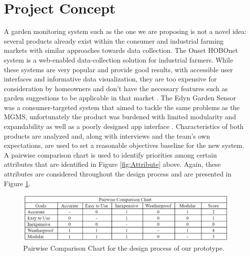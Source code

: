 \documentclass{report}
\begin{document}
\section{Project Concept}
A garden monitoring system such as the one we are proposing is not a novel idea: several products already exist within the consumer and industrial farming markets with similar approaches towards data collection. The Onset HOBOnet system is a web-enabled data-collection solution for industrial farmers. While these systems are very popular and provide good results, with accessible user interfaces and informative data visualization, they are too expensive for consideration by homeowners and don’t have the necessary features such as garden suggestions to be applicable in that market \cite{onsethobo}. The Edyn Garden Sensor was a consumer-targeted system that aimed to tackle the same problems as the MGMS, unfortunately the product was burdened with limited modularity and expandability as well as a poorly designed app interface \cite{edyn}. Characteristics of both products are analyzed and, along with interviews and the team’s own expectations, are used to set a reasonable objectives baseline for the new system.\\

A pairwise comparison chart is used to identify priorities among certain attributes that are identified in Figure \ref{fig:Attribute} above. Again, these attributes are considered throughout the design process and are presented in Figure \ref{fig:Pairwise}.\\

\begin{figure}[H] %
    \centering
    \includegraphics{PNGs/PairwiseComparison.PNG}
    \caption{Pairwise Comparison Chart for the design process of our prototype.}
    \label{fig:Pairwise}
\end{figure}

\newpage
\end{document}
